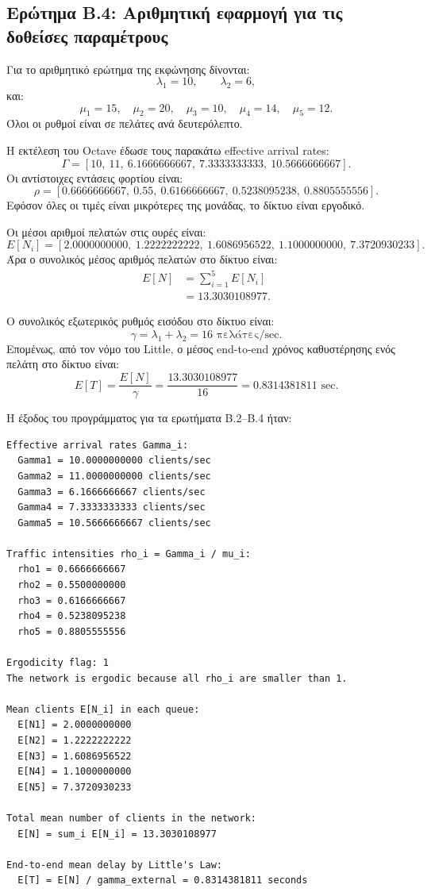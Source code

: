 \documentclass{article}
\begin{document}
\subsection{Ερώτημα Β.4: Αριθμητική εφαρμογή για τις δοθείσες παραμέτρους}

Για το αριθμητικό ερώτημα της εκφώνησης δίνονται:
\[
    \lambda_1=10,
    \qquad
    \lambda_2=6,
\]
και:
\[
    \mu_1=15,\quad
    \mu_2=20,\quad
    \mu_3=10,\quad
    \mu_4=14,\quad
    \mu_5=12.
\]
Όλοι οι ρυθμοί είναι σε πελάτες ανά δευτερόλεπτο.

Η εκτέλεση του Octave έδωσε τους παρακάτω effective arrival rates:
\[
    \Gamma =
    [10,\ 11,\ 6.1666666667,\ 7.3333333333,\ 10.5666666667].
\]
Οι αντίστοιχες εντάσεις φορτίου είναι:
\[
    \rho =
    [0.6666666667,\ 0.55,\ 0.6166666667,\ 0.5238095238,\ 0.8805555556].
\]
Εφόσον όλες οι τιμές είναι μικρότερες της μονάδας, το δίκτυο είναι εργοδικό.

Οι μέσοι αριθμοί πελατών στις ουρές είναι:
\[
    E[N_i] =
    [2.0000000000,\ 1.2222222222,\ 1.6086956522,\ 1.1000000000,\ 7.3720930233].
\]
Άρα ο συνολικός μέσος αριθμός πελατών στο δίκτυο είναι:
\[
\begin{aligned}
    E[N]
    &=
    \sum_{i=1}^{5} E[N_i] \\
    &=
    13.3030108977.
\end{aligned}
\]

Ο συνολικός εξωτερικός ρυθμός εισόδου στο δίκτυο είναι:
\[
    \gamma = \lambda_1+\lambda_2 = 16 \text{ πελάτες/sec}.
\]
Επομένως, από τον νόμο του Little, ο μέσος end-to-end χρόνος καθυστέρησης ενός πελάτη στο δίκτυο είναι:
\[
    E[T] = \frac{E[N]}{\gamma}
    =
    \frac{13.3030108977}{16}
    =
    0.8314381811 \text{ sec}.
\]

Η έξοδος του προγράμματος για τα ερωτήματα Β.2--Β.4 ήταν:

\begin{verbatim}
Effective arrival rates Gamma_i:
  Gamma1 = 10.0000000000 clients/sec
  Gamma2 = 11.0000000000 clients/sec
  Gamma3 = 6.1666666667 clients/sec
  Gamma4 = 7.3333333333 clients/sec
  Gamma5 = 10.5666666667 clients/sec

Traffic intensities rho_i = Gamma_i / mu_i:
  rho1 = 0.6666666667
  rho2 = 0.5500000000
  rho3 = 0.6166666667
  rho4 = 0.5238095238
  rho5 = 0.8805555556

Ergodicity flag: 1
The network is ergodic because all rho_i are smaller than 1.

Mean clients E[N_i] in each queue:
  E[N1] = 2.0000000000
  E[N2] = 1.2222222222
  E[N3] = 1.6086956522
  E[N4] = 1.1000000000
  E[N5] = 7.3720930233

Total mean number of clients in the network:
  E[N] = sum_i E[N_i] = 13.3030108977

End-to-end mean delay by Little's Law:
  E[T] = E[N] / gamma_external = 0.8314381811 seconds
\end{verbatim}
\end{document}
